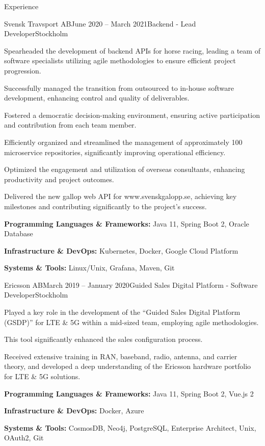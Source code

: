 \documentclass{resume}
\begin{document}
\begin{rSection}{Experience}
    \begin{rSubsection}{Svensk Travsport AB}{June 2020 -- March 2021}{Backend - Lead Developer}{Stockholm}
      \item Spearheaded the development of backend APIs for horse racing, leading a team of software specialists utilizing agile methodologies to ensure efficient project progression.
      \item Successfully managed the transition from outsourced to in-house software development, enhancing control and quality of deliverables.
      \item Fostered a democratic decision-making environment, ensuring active participation and contribution from each team member.
      \item Efficiently organized and streamlined the management of approximately 100 microservice repositories, significantly improving operational efficiency.
      \item Optimized the engagement and utilization of overseas consultants, enhancing productivity and project outcomes.
      \item Delivered the new gallop web API for www.svenskgalopp.se, achieving key milestones and contributing significantly to the project's success.
      \item \textbf{Programming Languages \& Frameworks:} Java 11, Spring Boot 2, Oracle Database
      \item \textbf{Infrastructure \& DevOps:} Kubernetes, Docker, Google Cloud Platform
      \item \textbf{Systems \& Tools:} Linux/Unix, Grafana, Maven, Git
    \end{rSubsection}

    \begin{rSubsection}{Ericsson AB}{March 2019 -- January 2020}{Guided Sales Digital Platform - Software Developer}{Stockholm}
      \item Played a key role in the development of the ``Guided Sales Digital Platform (GSDP)'' for LTE \& 5G within a mid-sized team, employing agile methodologies.
      \item This tool significantly enhanced the sales configuration process.
      \item Received extensive training in RAN, baseband, radio, antenna, and carrier theory, and developed a deep understanding of the Ericsson hardware portfolio for LTE \& 5G solutions.
      \item \textbf{Programming Languages \& Frameworks:} Java 11, Spring Boot 2, Vue.js 2
      \item \textbf{Infrastructure \& DevOps:} Docker, Azure
      \item \textbf{Systems \& Tools:} CosmosDB, Neo4j, PostgreSQL, Enterprise Architect, Unix, OAuth2, Git
    \end{rSubsection}


\end{rSection}
\end{document}
